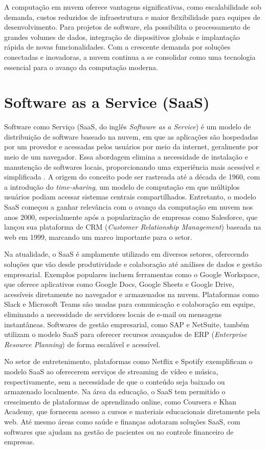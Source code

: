 A computação em nuvem oferece vantagens significativas, como escalabilidade sob demanda, custos reduzidos de infraestrutura e maior flexibilidade para equipes de desenvolvimento. Para projetos de software, ela possibilita o processamento de grandes volumes de dados, integração de dispositivos globais e implantação rápida de novas funcionalidades. Com a crescente demanda por soluções conectadas e inovadoras, a nuvem continua a se consolidar como uma tecnologia essencial para o avanço da computação moderna.

\section{Software as a Service (SaaS)}

Software como Serviço (SaaS, do inglês \textit{Software as a Service}) é um modelo de distribuição de software baseado na nuvem, em que as aplicações são hospedadas por um provedor e acessadas pelos usuários por meio da internet, geralmente por meio de um navegador. Essa abordagem elimina a necessidade de instalação e manutenção de softwares locais, proporcionando uma experiência mais acessível e simplificada \cite{1236470}. A origem do conceito pode ser rastreada até a década de 1960, com a introdução do \textit{time-sharing}, um modelo de computação em que múltiplos usuários podiam acessar sistemas centrais compartilhados. Entretanto, o modelo SaaS começou a ganhar relevância com o avanço da computação em nuvem nos anos 2000, especialmente após a popularização de empresas como Salesforce, que lançou sua plataforma de CRM (\textit{Customer Relationship Management}) baseada na web em 1999, marcando um marco importante para o setor.

Na atualidade, o SaaS é amplamente utilizado em diversos setores, oferecendo soluções que vão desde produtividade e colaboração até análises de dados e gestão empresarial. Exemplos populares incluem ferramentas como o Google Workspace, que oferece aplicativos como Google Docs, Google Sheets e Google Drive, acessíveis diretamente no navegador e armazenados na nuvem. Plataformas como Slack e Microsoft Teams são usadas para comunicação e colaboração em equipe, eliminando a necessidade de servidores locais de e-mail ou mensagens instantâneas. Softwares de gestão empresarial, como SAP e NetSuite, também utilizam o modelo SaaS para oferecer recursos avançados de ERP (\textit{Enterprise Resource Planning}) de forma escalável e acessível.

No setor de entretenimento, plataformas como Netflix e Spotify exemplificam o modelo SaaS ao oferecerem serviços de streaming de vídeo e música, respectivamente, sem a necessidade de que o conteúdo seja baixado ou armazenado localmente. Na área da educação, o SaaS tem permitido o crescimento de plataformas de aprendizado online, como Coursera e Khan Academy, que fornecem acesso a cursos e materiais educacionais diretamente pela web. Até mesmo áreas como saúde e finanças adotaram soluções SaaS, com softwares que ajudam na gestão de pacientes ou no controle financeiro de empresas.

